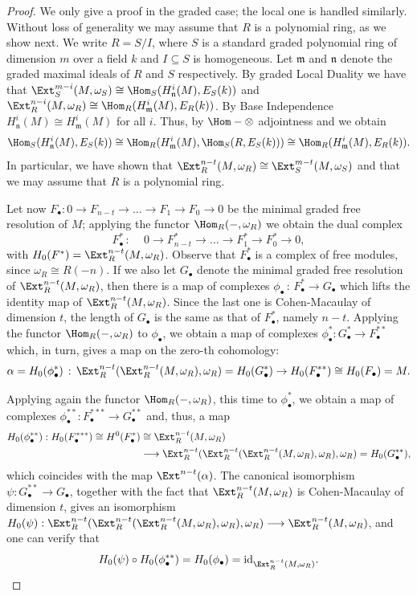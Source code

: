 \documentclass[12pt]{amsart}
\theoremstyle{definition}
\theoremstyle{definition}
\def\frk{\mathfrak}               %
\def\mm{{\frk m}}
\def\nn{{\frk n}}
\let\:=\colon
\let\lra\longrightarrow
\begin{document}
 \begin{proof}
   We only give a proof in the graded case; the local one is handled similarly. Without loss of generality we may assume that $R$ is a polynomial ring, as we show next. We write $R=S/I$, where $S$ is a standard graded polynomial ring of dimension $m$ over a field $k$ and $I \subseteq S$ is homogeneous. Let $\mm$ and $\nn$ denote the graded maximal ideals of  $R$ and $S$ respectively. By graded Local Duality \cite[Theorem 3.6.19]{BH93} we have that  $\Ext^{m-i}_S(M,\omega_S)\cong \Hom_S(H^{i}_\nn(M),E_S(k))$ and   $\Ext^{n-i}_R(M,\omega_R)\cong \Hom_R(H^{i}_\mm(M),E_R(k))$. By Base Independence  $H^i_{\nn}(M)\cong H^i_\mm(M)$ for all $i$. Thus, by  $\Hom-\otimes$ adjointness and \cite[Lemma 3.1.6]{BH93} we obtain
$$\Hom_S(H^i_\nn(M),E_S(k)) \cong \Hom_R(H^i_\mm(M),\Hom_S(R, E_S(k)))
\cong \Hom_R(H^{i}_\mm(M),E_R(k)).$$
In particular, we have shown that $\Ext^{n-t}_R(M,\omega_R)\cong\Ext^{m-t}_S(M, \omega_S)$ and that  we may assume that $R$ is a polynomial ring.

\smallskip
Let now $
F_\bullet\: 0\lra F_{n-t}\lra \ldots\lra F_1\lra F_0 \lra 0$
be the minimal graded free resolution of $M$; applying the functor $\Hom_R(-,\omega_R)$ we obtain the dual complex 
\[
F^*_\bullet\,:\,\,\,\,\,\,\,0\lra F^*_{n-t}\lra \ldots \lra F^*_1\lra F^*_0\lra 0, 
\]
with  $H_0(F^*)=\Ext_R^{n-t}(M,\omega_R)$. Observe that $F^*_\bullet$ is a complex of free modules, since  $\omega_R \cong R(-n)$.
If we also let  $G_\bullet$ denote  the minimal graded free resolution of $\Ext_R^{n-t}(M,\omega_R)$, then there is a map of complexes $\phi_\bullet\,:\, F^*_\bullet\lra G_\bullet$ which lifts the identity map of   
$\Ext_R^{n-t}(M,\omega_R)$. Since the last one is Cohen-Macaulay of dimension $t$, the length of  $G_\bullet$ is the same as  
that of  $F^*_\bullet$, namely $n-t$. Applying the functor $\Hom_R(-,\omega_R)$ to $\phi_\bullet$, we obtain a map of complexes $\phi^*_\bullet\: G^*_\bullet\lra F_\bullet^{**}$ which, in turn, gives a map on the zero-th cohomology:
\[
\alpha=H_0(\phi^*_\bullet)\,:\,  
\Ext_R^{n-t}(\Ext_R^{n-t}(M,\omega_R),\omega_R)=H_0(G^*_\bullet)\to H_0(F_\bullet^{**}) \cong H_0(F_\bullet)=M.
\]

\noindent Applying again the functor $\Hom_R(-,\omega_R)$, this time to $\phi^*_\bullet$, we obtain  a map of complexes $\phi^{**}_\bullet: F_\bullet^{***} \to G^{**}_\bullet$ and, thus, a map 
\[
\begin{split}
H_0(\phi^{**}_\bullet): H_0(F^{***}_\bullet) \cong H^0(F^*_\bullet)& \cong \Ext^{n-t}_R(M,\omega_R) \\
& \lra \Ext^{n-t}_R(\Ext^{n-t}_R(\Ext^{n-t}_R(M,\omega_R),\omega_R),\omega_R) = H_0(G^{**}_\bullet),
\end{split}
\]
which coincides with the map $\Ext^{n-t}(\alpha)$. The canonical isomorphism $\psi: G_\bullet^{**} {\lra} G_\bullet$, together with the fact that $\Ext^{n-t}_R(M,\omega_R)$ is Cohen-Macaulay of dimension $t$, gives an isomorphism $H_0(\psi):\Ext^{n-t}_R(\Ext^{n-t}_R(\Ext^{n-t}_R(M,\omega_R),\omega_R),\omega_R) \lra \Ext^{n-t}_R(M,\omega_R)$, and one can verify that 
\[
H_0(\psi) \circ H_0(\phi_\bullet^{**}) = H_0(\phi_\bullet) = {\rm id}_{\Ext^{n-t}_R(M,\omega_R)}.
\]



\end{proof}
\end{document}
